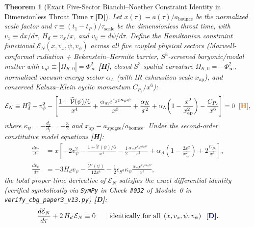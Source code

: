 \documentclass[11pt,a4paper]{article}
\newcommand{\catD}{\textbf{\textcolor{blue!75!black}{[D]}}}
\newcommand{\catH}{\textbf{\textcolor{orange!85!black}{[H]}}}
\theoremstyle{plain}
\newtheorem{theorem}{Theorem}[section]
\theoremstyle{definition}
\theoremstyle{remark}
\numberwithin{equation}{section}
\begin{document}
\begin{theorem}[Exact Five-Sector Bianchi--Noether Constraint Identity in Dimensionless Throat Time $\tau$ \catD]
\label{thm:five_sector_bianchi_noether_p3}
Let $x(\tau) \equiv a(\tau)/a_{\text{bounce}}$ be the normalized scale factor and $\tau \equiv (t_1 - t_P)/\tau_{\text{scale}}$ be the dimensionless throat time, with $v_x \equiv dx/d\tau$, $H_d \equiv v_x/x$, and $v_{\psi} \equiv d\psi/d\tau$. Define the Hamiltonian constraint functional $\mathcal{E}_N(x, v_x, \psi, v_{\psi})$ across all five coupled physical sectors (Maxwell-conformal radiation + Bekenstein--Hermite barrier, $S^3$-screened baryonic/modal matter with $\epsilon_{S^3} \equiv |\Omega_{K,0}| = \Phi_{\infty}^2$ \catH, closed $S^3$ spatial curvature $\Omega_{K,0} = -\Phi_{\infty}^2$, normalized vacuum-energy sector $\alpha_{\Lambda}$ (with IR exhaustion scale $x_{\text{ap}}$), and conserved Kaluza--Klein cyclic momentum $C_{P_2}/x^6$):
\begin{equation}
  \mathcal{E}_N \equiv H_d^2 - v_{\psi}^2 - \left[\frac{1 + \widetilde{\mathcal{V}}(\psi)/6}{x^4} + \frac{\alpha_m e^{\epsilon_{S^3}\kappa_{\psi}\psi}}{x^3} + \frac{\alpha_K}{x^2} + \alpha_{\Lambda}\!\left(1 - \frac{x^2}{x_{\text{ap}}^2}\right) - \frac{C_{P_2}}{x^6}\right] = 0 \;\;\catH,
  \label{eq:five_sector_EN_constraint_p3}
\end{equation}
where $\kappa_{\psi} = -\frac{d_s}{d_t} = -\frac{3}{2}$ and $x_{\text{ap}} \equiv a_{\text{apogee}}/a_{\text{bounce}}$. Under the second-order constitutive model equations \catH:
\begin{align}
  \frac{dv_x}{d\tau} &= x\left[-2v_{\psi}^2 - \frac{1 + \widetilde{\mathcal{V}}(\psi)/6}{x^4} - \frac{1}{2}\frac{\alpha_m e^{\epsilon_{S^3}\kappa_{\psi}\psi}}{x^3} + \alpha_{\Lambda}\!\left(1 - \frac{2x^2}{x_{\text{ap}}^2}\right) + 2\frac{C_{P_2}}{x^6}\right], \label{eq:five_sector_dvx_p3} \\[4pt]
  \frac{dv_{\psi}}{d\tau} &= -3H_d v_{\psi} - \frac{\widetilde{\mathcal{V}}'(\psi)}{12 x^4} - \frac{1}{2}\epsilon_{S^3}\kappa_{\psi}\frac{\alpha_m e^{\epsilon_{S^3}\kappa_{\psi}\psi}}{x^3},
  \label{eq:five_sector_dvpsi_p3}
\end{align}
the total proper-time derivative of $\mathcal{E}_N$ satisfies the exact differential identity (verified symbolically via \texttt{SymPy} in Check~\texttt{\#032} of Module~0 in \allowbreak\texttt{verify\_cbg\_paper3\_v13.py}) \catD:
\begin{equation}
  \frac{d\mathcal{E}_N}{d\tau} + 2\,H_d\,\mathcal{E}_N \equiv 0 \qquad \text{identically for all }\left(x, v_x, \psi, v_{\psi}\right) \;\;\catD.

\end{equation}
\end{theorem}
\end{document}
